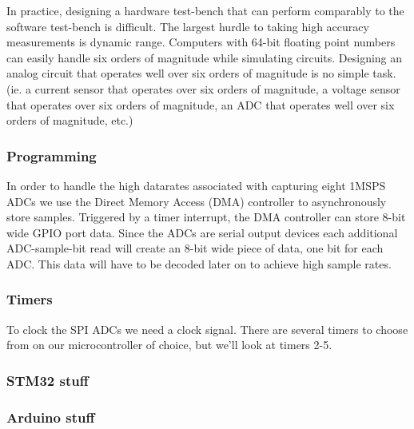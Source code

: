 \documentclass[11pt, a4paper]{article}
\begin{document}
In practice, designing a hardware test-bench that can perform comparably to the software test-bench is difficult.
The largest hurdle to taking high accuracy measurements is dynamic range.
Computers with 64-bit floating point numbers can easily handle six orders of magnitude while simulating circuits.
Designing an analog circuit that operates well over six orders of magnitude is no simple task.
(ie. a current sensor that operates over six orders of magnitude, a voltage sensor that operates over six orders of magnitude, an ADC that operates well over six orders of magnitude, etc.)


\subsubsection{Programming}

In order to handle the high datarates associated with capturing eight 1MSPS ADCs we use the Direct Memory Access (DMA) controller to asynchronously store samples.
Triggered by a timer interrupt, the DMA controller can store 8-bit wide GPIO port data.
Since the ADCs are serial output devices each additional ADC-sample-bit read will create an 8-bit wide piece of data, one bit for each ADC.
This data will have to be decoded later on to achieve high sample rates.

\subsubsection{Timers}

To clock the SPI ADCs we need a clock signal.   
There are several timers to choose from on our microcontroller of choice, but we'll look at timers 2-5.

\subsubsection{STM32 stuff}

\subsubsection{Arduino stuff}

\begin{thebibliography}{1}
\end{thebibliography}
\end{document}
